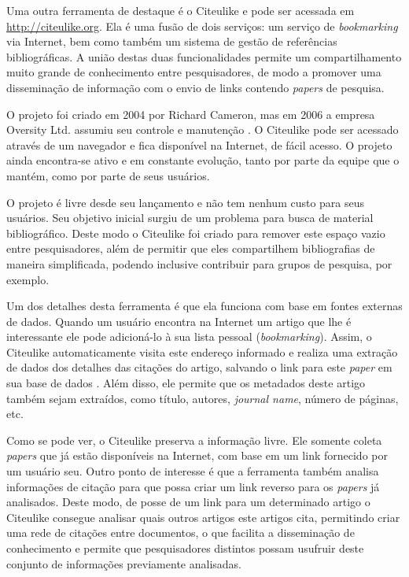 \begin{textnew}

Uma outra ferramenta de destaque é o Citeulike \cite{citeulike} e pode ser acessada em \url{http://citeulike.org}. Ela é uma fusão de dois serviços: um serviço de \emph{bookmarking} via Internet, bem como também um sistema de gestão de referências bibliográficas. A união destas duas funcionalidades permite um compartilhamento muito grande de conhecimento entre pesquisadores, de modo a promover uma disseminação de informação com o envio de links contendo \emph{papers} de pesquisa. 

O projeto foi criado em 2004 por Richard Cameron, mas em 2006 a empresa Oversity Ltd. assumiu seu controle e manutenção \cite{Citeulike-FAQ}. O Citeulike pode ser acessado através de um navegador e fica disponível na Internet, de fácil acesso. O projeto ainda encontra-se ativo e em constante evolução, tanto por parte da equipe que o mantém, como por parte de seus usuários.

O projeto é livre desde seu lançamento e não tem nenhum custo para seus usuários. Seu objetivo inicial surgiu de um problema para busca de material bibliográfico. Deste modo o Citeulike foi criado para remover este espaço vazio entre pesquisadores, além de permitir que eles compartilhem bibliografias de maneira simplificada, podendo inclusive contribuir para grupos de pesquisa, por exemplo.

Um dos detalhes desta ferramenta é que ela funciona com base em fontes externas de dados. Quando um usuário encontra na Internet um artigo que lhe é interessante ele pode adicioná-lo à sua lista pessoal (\emph{bookmarking}). Assim, o Citeulike automaticamente visita este endereço informado e realiza uma extração de dados dos detalhes das citações do artigo, salvando o link para este \emph{paper} em sua base de dados \cite{citeulike}. Além disso, ele permite que os metadados deste artigo também sejam extraídos, como título, autores, \emph{journal name}, número de páginas, etc.

Como se pode ver, o Citeulike preserva a informação livre. Ele somente coleta \emph{papers} que já estão disponíveis na Internet, com base em um link fornecido por um usuário seu. Outro ponto de interesse é que a ferramenta também analisa informações de citação para que possa criar um link reverso para os \emph{papers} já analisados. Deste modo, de posse de um link para um determinado artigo o Citeulike consegue analisar quais outros artigos este artigos cita, permitindo criar uma rede de citações entre documentos, o que facilita a disseminação de conhecimento e permite que pesquisadores distintos possam usufruir deste conjunto de informações previamente analisadas.


\end{textnew}
